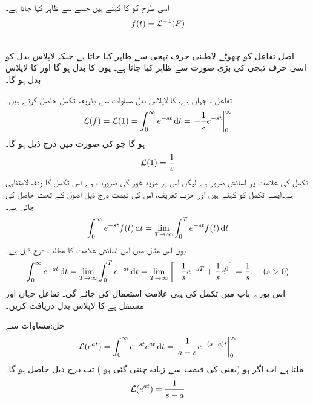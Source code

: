 اسی طرح  کو  کا  کہتے ہیں جسے  سے ظاہر کیا جاتا ہے۔
\begin{align}
f(t)=\mathcal{L}^{-1}(F)
\end{align}

\\
اصل تفاعل کو چھوٹے لاطینی حرف تہجی سے ظاہر کیا جاتا ہے جبکہ لاپلاس بدل کو اسی حرف تہجی کی بڑی صورت سے ظاہر کیا جاتا ہے۔ یوں  کا بدل  ہو گا اور  کا لاپلاس بدل  ہو گا۔

تفاعل ، جہاں  ہے، کا لاپلاس بدل مساوات  سے بذریعہ تکمل حاصل کرتے ہیں۔
\begin{align*}
\Laplace(f)=\Laplace(1)=\int_{0}^{\infty} e^{-st} \dif t=\left. -\frac{1}{s}e^{-st}\right|_{0}^{\infty}
\end{align*}
ہو گا جو  کی صورت میں درج ذیل ہو گا۔
\begin{align*}
\mathcal{L}(1)=\frac{1}{s}
\end{align*}
تکمل  کی علامت پر آسائش ضرور ہے لیکن اس پر مزید غور کی ضرورت ہے۔اس تکمل کا وقفہ لامتناہی ہے۔ایسے تکمل کو  کہتے ہیں اور حزب  تعریف، اس کی قیمت درج ذیل اصول کے تحت حاصل کی جاتی ہے۔ 
\begin{align*}
\int_{0}^{\infty} e^{-st}f(t)\dif t=\lim_{T\to \infty} \int_{0}^{T}e^{-st}f(t)\dif t
\end{align*}
یوں اس مثال میں اس آسائش علامت کا مطلب درج ذیل ہے۔
\begin{align*}
\int_{0}^{\infty}e^{-st}\dif t=\lim_{T\to \infty}\int_{0}^{T}e^{-st}\dif t=\lim_{T\to \infty}\left[-\frac{1}{s}e^{-sT}+\frac{1}{s}e^{0}\right]=\frac{1}{s}, \quad (s>0)
\end{align*}
اس پورے باب میں تکمل کی یہی علامت استعمال کی جائے گی۔
تفاعل  جہاں  اور  مستقل ہے کا لاپلاس بدل  دریافت کریں۔

حل:مساوات  سے
\begin{align*}
\Laplace(e^{at})=\int_{0}^{\infty} e^{-st}e^{at}\dif t=\left.\frac{1}{a-s}e^{-(s-a)t} \right|_{0}^{\infty}
\end{align*}
ملتا ہے۔اب اگر  ہو (یعنی  کی قیمت  سے زیادہ چننی گئی ہو۔)  تب درج ذیل حاصل ہو گا۔
\begin{align*}
\mathcal{L}(e^{at})=\frac{1}{s-a}
\end{align*}

